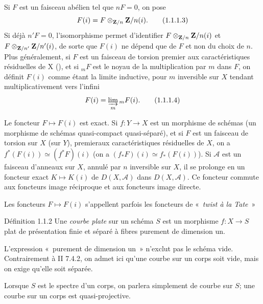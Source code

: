 \documentclass[10pt]{../fichiers-configuration-latex/smfart}
\begin{document}
Si $F$ est un faisceau abélien tel que $nF=0$, on pose
\begin{equation*}
F(i)=F\otimes_{\mathbf{Z}/n}\mathbf{Z}/n(i){}.\tag{1.1.1.3}
\end{equation*}%
Si déjà $n'F=0$, l'isomorphisme  permet d'identifier
$F\otimes_{\mathbf{Z}/n}\mathbf{Z}/n(i)$ et
${F\otimes_{\mathbf{Z}/n'}\mathbf{Z}/n'(i)}$, de sorte que
$F(i)$ ne dépend que de $F$ et non du choix de $n$. Plus généralement,
si $F$ est un faisceau de torsion premier aux caractéristiques
résiduelles de X (), et si ${}_{m}F$ est le noyau de la
multiplication par $m$ dans $F$, on définit $F(i)$ comme étant la
limite inductive, pour $m$ inversible sur $X$ tendant
multiplicativement vers l'infini
\begin{equation*}
F(i)=\varinjlim_{m}{}_{m}F(i){}.\tag{1.1.1.4}
\end{equation*}

Le foncteur $F\mapsto F(i)$  est exact. Si $f:Y\rightarrow X$ est un
morphisme de schémas (\resp un morphisme de schémas quasi-compact
quasi-séparé), et si $F$ est un faisceau de torsion sur $X$ (\resp sur
$Y$), premier\pageoriginale aux caractéristiques résiduelles de $X$,
on a $f^{\ast}(F(i))\simeq(f^{\ast}F)(i)$ (\resp on a
$(f_{\ast}F)(i)\simeq f_{\ast}(F(i))$). Si $\mathcal{A}$ est un faisceau
d'anneaux sur $X$, annulé par $n$ inversible sur $X$, il se prolonge
en un foncteur exact $K\mapsto K(i)$ de $D(X,\mathcal{A})$ dans
$D(X,\mathcal{A})$. Ce foncteur commute aux foncteurs image réciproque
et aux foncteurs image directe.

Les foncteurs $F\mapsto F(i)$ s'appellent parfois les foncteurs de « \emph{twist à la Tate} »

\begin{enonce*}{Définition 1.1.2}
Une \emph{courbe plate} sur un schéma $S$ est un morphisme
$f:X\rightarrow S$ plat de présentation finie et séparé à fibres
purement de dimension un.
\end{enonce*}

L'expression « purement de dimension un »  n'exclut pas le schéma
vide. Contrairement à \EGA II 7.4.2, on admet ici qu'une courbe sur un
corps soit vide, mais on exige qu'elle soit séparée.

Lorsque $S$ est le spectre d'un corps, on parlera simplement de courbe
sur $S$; une courbe sur un corps est quasi-projective.
\end{document}
